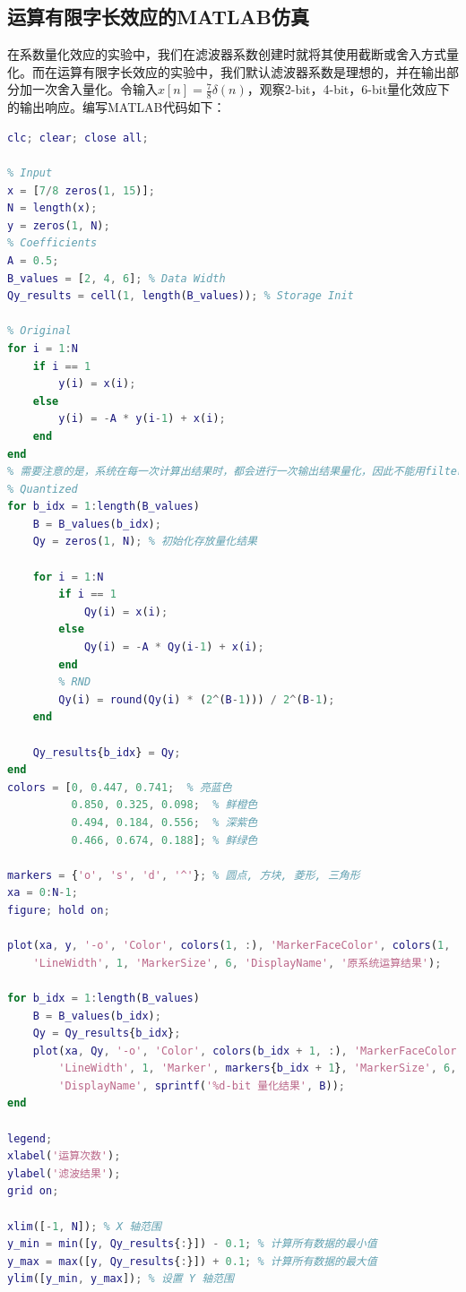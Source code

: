 \documentclass[lang=cn,newtx,10pt,scheme=chinese]{elegantbook}
\begin{document}
\subsection{运算有限字长效应的MATLAB仿真}
在系数量化效应的实验中，我们在滤波器系数创建时就将其使用截断或舍入方式量化。而在运算有限字长效应的实验中，我们默认滤波器系数是理想的，并在输出部分加一次舍入量化。令输入$x[n] = \frac{7}{8}\delta(n)$，观察2-bit，4-bit，6-bit量化效应下的输出响应。编写MATLAB代码如下：
\begin{lstlisting}[language=matlab]
clc; clear; close all;

% Input
x = [7/8 zeros(1, 15)];
N = length(x);
y = zeros(1, N);
% Coefficients
A = 0.5;
B_values = [2, 4, 6]; % Data Width
Qy_results = cell(1, length(B_values)); % Storage Init

% Original
for i = 1:N
    if i == 1
        y(i) = x(i);
    else
        y(i) = -A * y(i-1) + x(i);
    end
end
% 需要注意的是，系统在每一次计算出结果时，都会进行一次输出结果量化，因此不能用filter函数进行计算
% Quantized
for b_idx = 1:length(B_values)
    B = B_values(b_idx);
    Qy = zeros(1, N); % 初始化存放量化结果

    for i = 1:N
        if i == 1
            Qy(i) = x(i);
        else
            Qy(i) = -A * Qy(i-1) + x(i);
        end
        % RND
        Qy(i) = round(Qy(i) * (2^(B-1))) / 2^(B-1);
    end
    
    Qy_results{b_idx} = Qy;
end
colors = [0, 0.447, 0.741;  % 亮蓝色
          0.850, 0.325, 0.098;  % 鲜橙色
          0.494, 0.184, 0.556;  % 深紫色
          0.466, 0.674, 0.188]; % 鲜绿色

markers = {'o', 's', 'd', '^'}; % 圆点, 方块, 菱形, 三角形
xa = 0:N-1;
figure; hold on;

plot(xa, y, '-o', 'Color', colors(1, :), 'MarkerFaceColor', colors(1, :), ...
    'LineWidth', 1, 'MarkerSize', 6, 'DisplayName', '原系统运算结果');

for b_idx = 1:length(B_values)
    B = B_values(b_idx);
    Qy = Qy_results{b_idx};
    plot(xa, Qy, '-o', 'Color', colors(b_idx + 1, :), 'MarkerFaceColor', colors(b_idx + 1, :), ...
        'LineWidth', 1, 'Marker', markers{b_idx + 1}, 'MarkerSize', 6, ...
        'DisplayName', sprintf('%d-bit 量化结果', B));
end

legend;
xlabel('运算次数');
ylabel('滤波结果');
grid on;

xlim([-1, N]); % X 轴范围
y_min = min([y, Qy_results{:}]) - 0.1; % 计算所有数据的最小值
y_max = max([y, Qy_results{:}]) + 0.1; % 计算所有数据的最大值
ylim([y_min, y_max]); % 设置 Y 轴范围
\end{lstlisting}
\end{document}
